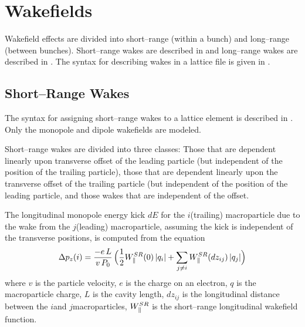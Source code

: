 \chapter{Wakefields}
\label{c:wakefields.eq}

Wakefield effects are divided into short--range (within a bunch) and long--range (between
bunches). Short--range wakes are described in  and long--range wakes are
described in . The syntax for describing wakes in a lattice file is given in
.

\section{Short--Range Wakes}
\label{s:sr.wake.eq}

The syntax for assigning short--range wakes to a lattice element is described in
. Only the monopole and dipole wakefields are modeled.

Short--range wakes are divided into three classes: Those that are dependent linearly upon transverse
offset of the leading particle (but independent of the position of the trailing particle), those
that are dependent linearly upon the transverse offset of the trailing particle (but independent of
the position of the leading particle, and those wakes that are independent of the offset.

The longitudinal monopole energy kick $dE$ for the $i$\Th (trailing) macroparticle due to the wake
from the $j$\Th (leading) macroparticle, assuming the kick is independent of the transverse
positions, is computed from the equation
\begin{equation}
  \Delta p_z(i) = \frac{-e \, L}{v \, P_0} \, \Bigl( \frac{1}{2}W^{SR}_\parallel(0) \,  |q_i| +
        \sum_{j \ne i} W^{SR}_\parallel(dz_{ij}) \, |q_j| \Bigr)
  \label{delvp1}
\end{equation}
where $v$ is the particle velocity, $e$ is the charge on an electron, $q$ is the macroparticle
charge, $L$ is the cavity length, $dz_{ij}$ is the longitudinal distance between the $i$\Th and
$j$\Th macroparticles, $W^{SR}_\parallel$ is the short--range longitudinal wakefield function.

